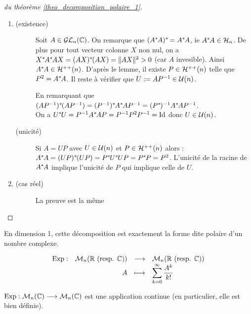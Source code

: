 \begin{proof}[du théorème \ref{theo_decomposition_polaire_1}]\

\begin{enumerate}
 \item \begin{description}
        \item[(existence)] Soit $A\in\mathcal{GL}_n(\mathbb{C})$. On remarque que
$(A^{*}\hspace{-0.1em}A)^{*}\hspace{-0.1em}=A^{*}\hspace{-0.1em}A$,
ie $A^{*}\hspace{-0.1em}A\in \mathcal{H}_n$. De plus pour tout vecteur colonne $X$ non nul, on a $X^{*}\hspace{-0.1em}A^{*}\hspace{-0.1em}AX
= (AX)^{*}\hspace{-0.1em}(AX) = |\negthinspace\hspace{0.07em}|AX|\negthinspace\hspace{0.07em}|^2 > 0$ (car $A$ invesible). Ainsi $A^{*}\hspace{-0.1em}A\in\mathcal{H}^{++}(n)$.
D'après le lemme, il existe $P\in\mathcal{H}^{++}(n)$ telle que $P^2=A^{*}\hspace{-0.1em}A$. Il reste à
vérifier que $U := AP^{-1} \in\mathcal{U}(n)$.

En remarquant que $(AP^{-1})^{*}\hspace{-0.1em}(AP^{-1}) = (P^{-1})^{*}\hspace{-0.1em}A^{*}\hspace{-0.1em}AP^{-1} =
(P^{*}\hspace{-0.1em})^{-1}A^{*}\hspace{-0.1em}AP^{-1}$.\\ On a $U^{*}\hspace{-0.1em}U = P^{-1}A^{*}\hspace{-0.1em}AP = P^{-1}P^2P^{-1} = \operatorname{Id}$ donc
$U\in\mathcal{U}(n)$.
\item[(unicité)] Si $A=UP$ avec $U\in\mathcal{U}(n)$ et $P\in \mathcal{H}^{++}(n)$ alors :\\
$A^{*}\hspace{-0.1em}A=(UP)^{*}\hspace{-0.1em}(UP) = P^{*}\hspace{-0.1em}U^{*}\hspace{-0.1em}UP = P^{*}\hspace{-0.1em}P = P^2$. L'unicité de la racine de $A^{*}\hspace{-0.1em}A$
implique l'unicité de $P$ qui implique celle de $U$.
       \end{description}
\item \begin{description}
       \item [(cas réel)] La preuve est la même
      \end{description}
\end{enumerate}
\end{proof}

\begin{example}[Exemple]
 En dimension 1, cette décomposition est exactement la forme dite polaire d'un
nombre complexe.
\end{example}

\begin{defi}[Exponentielle]
\begin{displaymath}
\begin{array}{rrcl} \operatorname{Exp} : &          \mathcal{M}_n(\mathbb{R}\text{ (resp. }\mathbb{C}\text{)})
&\longrightarrow& \mathcal{M}_n(\mathbb{R}\text{ (resp. }\mathbb{C}\text{)}) \\
   & A &\longmapsto& \displaystyle\sum_{k=0}^{\infty} \dfrac{A^k}{k!}   
\end{array}
\end{displaymath}
\end{defi}

\begin{prop}
 
$\operatorname{Exp} : \mathcal{M}_n(\mathbb{C}) \longrightarrow \mathcal{M}_n(\mathbb{C})$ est une application continue (en
particulier, elle est bien définie).
\end{prop}

